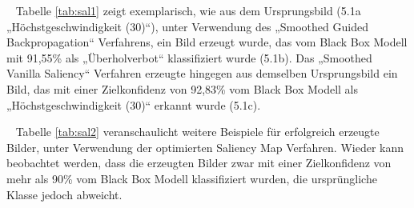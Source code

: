 ~\newline
Tabelle \ref{tab:sal1} zeigt exemplarisch, wie aus dem Ursprungsbild (5.1a „Höchstgeschwindigkeit (30)“), unter Verwendung des „Smoothed Guided Backpropagation“ Verfahrens, ein Bild erzeugt wurde, das vom Black Box Modell mit 91,55\% als „Überholverbot“ klassifiziert wurde (5.1b). 
Das „Smoothed Vanilla Saliency“ Verfahren erzeugte hingegen aus demselben Ursprungsbild ein Bild, das mit einer Zielkonfidenz von 92,83\% vom Black Box Modell als „Höchstgeschwindigkeit (30)“ erkannt wurde (5.1c).


~\newline
Tabelle \ref{tab:sal2} veranschaulicht weitere Beispiele für erfolgreich erzeugte Bilder, unter Verwendung der optimierten Saliency Map Verfahren. Wieder kann beobachtet werden, dass die erzeugten Bilder zwar mit einer Zielkonfidenz von mehr als 90\% vom Black Box Modell klassifiziert wurden, die ursprüngliche Klasse jedoch abweicht.

